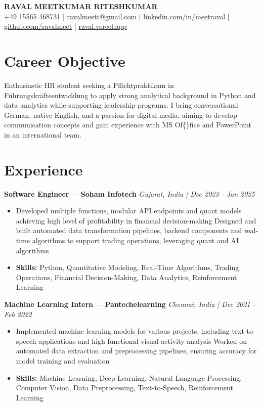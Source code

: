 \documentclass[a4paper,10pt]{article}
\begin{document}
\begin{center}
  {\Large\bfseries RAVAL MEETKUMAR RITESHKUMAR}\\[2pt]
  {\small +49 15565 468731 \;|\; \href{mailto:ravalmeett@gmail.com}{ravalmeett@gmail.com} \;|\; \href{https://www.linkedin.com/in/meetraval/}{linkedin.com/in/meetraval} \;|\; \href{https://github.com/ravalmeet}{github.com/ravalmeet} \;|\; \href{https://raval.vercel.app/}{raval.vercel.app}}
\end{center}
\vspace{-3pt}

\section*{Career Objective}
Enthusiastic HR student seeking a Pflichtpraktikum in Führungskräfteentwicklung to apply strong analytical background in Python and data analytics while supporting leadership programs. I bring conversational German, native English, and a passion for digital media, aiming to develop communication concepts and gain experience with MS Of\{\}fice and PowerPoint in an international team.\par

\section*{Experience}
\textbf{Software Engineer} — \textbf{Soham Infotech} \hfill \textit{Gujarat, India \;|\; Dec 2023 - Jan 2025}\par
\vspace{1pt}
\begin{itemize}
  \item Developed multiple functions, modular API endpoints and quant models achieving high level of profitability in financial decision-making Designed and built automated data transformation pipelines, backend components and real-time algorithms to support trading operations, leveraging quant and AI algorithms
  \item \textbf{Skills:} Python, Quantitative Modeling, Real-Time Algorithms, Trading Operations, Financial Decision-Making, Data Analytics, Reinforcement Learning
\end{itemize}
\vspace{3pt}
\textbf{Machine Learning Intern} — \textbf{Pantechelearning} \hfill \textit{Chennai, India \;|\; Dec 2021 - Feb 2022}\par
\vspace{1pt}
\begin{itemize}
  \item Implemented machine learning models for various projects, including text-to-speech applications and high functional visual-activity analysis Worked on automated data extraction and preprocessing pipelines, ensuring accuracy for model training and evaluation
  \item \textbf{Skills:} Machine Learning, Deep Learning, Natural Language Processing, Computer Vision, Data Preprocessing, Text-to-Speech, Reinforcement Learning
\end{itemize}
\end{document}
